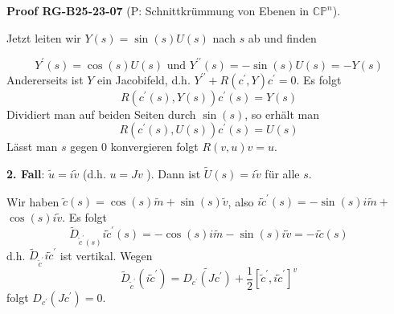 \documentclass[10pt, letterpaper]{article}
\newcommand{\CustomHeading}[3]{%
  \par\medskip\noindent%
  \textbf{#1 #2} \textnormal{(#3)}.\enskip%
}
\newenvironment{PROOF}[2]{\begin{unitbox}\CustomHeading{Proof}{#1}{#2}}{\end{unitbox}}
\begin{document}
\begin{PROOF}{RG-B25-23-07}{P: Schnittkrümmung von Ebenen in $\mathbb{C P}^{n}$}
Jetzt leiten wir $Y(s)=\sin (s) U(s)$ nach $s$ ab und finden 

$$Y^{\prime}(s)=\cos (s) U(s) \text{ und } Y^{\prime \prime}(s)=-\sin (s) U(s)=-Y(s)$$
Andererseits ist $Y$ ein Jacobifeld, d.h. $Y^{\prime \prime}+R\left(c^{\prime}, Y\right) c^{\prime}=0$. Es folgt
$$
R\left(c^{\prime}(s), Y(s)\right) c^{\prime}(s)=Y(s)
$$
Dividiert man auf beiden Seiten durch $\sin (s)$, so erhält man
$$
R\left(c^{\prime}(s), U(s)\right) c^{\prime}(s)=U(s)
$$
Lässt man $s$ gegen 0 konvergieren folgt $R(v, u) v=u$.


\textbf{2. Fall}: $\tilde{u}=i \tilde{v}$ (d.h. $u=J v$ ). Dann ist $\tilde{U}(s)=i \tilde{v}$ für alle $s$.

Wir haben $\tilde{c}(s)=\cos (s) \tilde{m}+\sin (s) \tilde{v}$, also $i \tilde{c}^{\prime}(s)=-\sin (s) i \tilde{m}+$ $\cos (s) i \tilde{v}$. Es folgt
$$
\tilde{D}_{\tilde{c}^{\prime}(s)} i \tilde{c}^{\prime}(s)=-\cos (s) i \tilde{m}-\sin (s) i \tilde{v}=-i \tilde{c}(s)
$$
d.h. $\tilde{D}_{\tilde{c}^{\prime}} i \tilde{c}^{\prime}$ ist vertikal. Wegen
$$
\tilde{D}_{\tilde{c}^{\prime}}\left(i \tilde{c}^{\prime}\right)=\widetilde{D_{c^{\prime}}\left(J c^{\prime}\right)}+\frac{1}{2}\left[\tilde{c}^{\prime}, i \tilde{c}^{\prime}\right]^{v}
$$
folgt $D_{c^{\prime}}\left(J c^{\prime}\right)=0$.


\end{PROOF}
\end{document}
